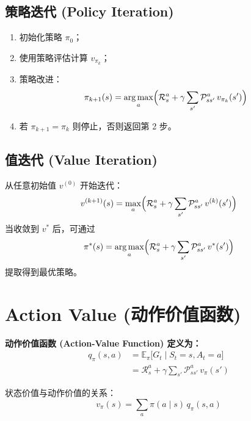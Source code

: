 \documentclass[a4paper]{article}
\DeclareMathOperator*{\argmax}{arg\,max}
\begin{document}
\subsection{策略迭代 (Policy Iteration)}
\begin{enumerate}
    \item 初始化策略 $\pi_0$；
    \item 使用策略评估计算 $v_{\pi_k}$；
    \item 策略改进：
    \begin{equation*}
    \pi_{k+1}(s) = \argmax_a \Bigl(\mathcal{R}_s^a + \gamma \sum_{s'} \mathcal{P}_{ss'}^a\,v_{\pi_k}(s')\Bigr)
    \end{equation*}
    \item 若 $\pi_{k+1} = \pi_k$ 则停止，否则返回第 2 步。
\end{enumerate}

\subsection{值迭代 (Value Iteration)}
从任意初始值 $v^{(0)}$ 开始迭代：
\begin{equation*}
v^{(k+1)}(s) = \max_a \Bigl(\mathcal{R}_s^a + \gamma \sum_{s'} \mathcal{P}_{ss'}^a\,v^{(k)}(s')\Bigr)
\end{equation*}
当收敛到 $v^*$ 后，可通过
\begin{equation*}
\pi^*(s) = \argmax_a \Bigl(\mathcal{R}_s^a + \gamma \sum_{s'} \mathcal{P}_{ss'}^a\,v^*(s')\Bigr)
\end{equation*}
提取得到最优策略。

\hrulefill

\section{Action Value (动作价值函数)}

\textbf{动作价值函数 (Action-Value Function) 定义为：}
\begin{align*}
q_\pi(s, a) &= \mathbb{E}_\pi \bigl[G_t \mid S_t = s, A_t = a\bigr] \\
            &= \mathcal{R}_s^a + \gamma \sum_{s'} \mathcal{P}_{ss'}^a\,v_\pi(s')
\end{align*}

状态价值与动作价值的关系：
\begin{equation*}
v_\pi(s) = \sum_a \pi(a \mid s)\,q_\pi(s, a)
\end{equation*}

\hrulefill
\end{document}
